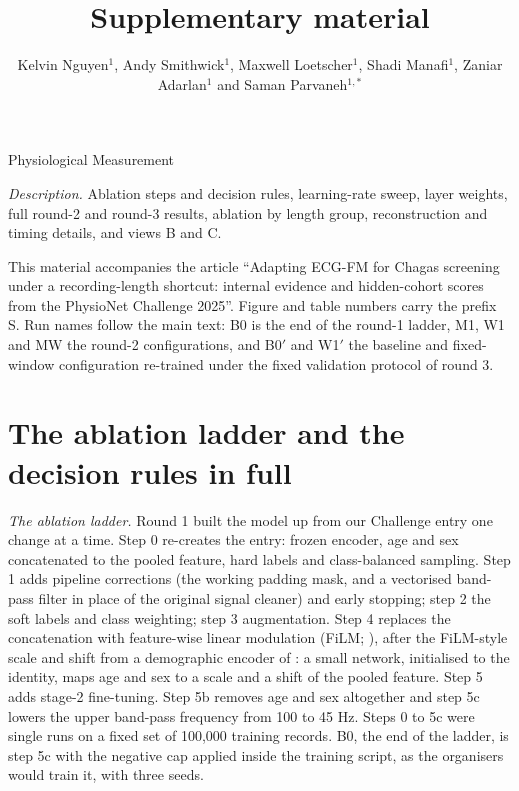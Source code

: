 \documentclass{iopjournal}
\newcommand{\Bp}{B0$'$}
\newcommand{\Wp}{W1$'$}
\renewcommand{\articletype}[1]{{\vspace*{-8mm}\noindent \Large \sf Physiological Measurement}

\vspace{4mm}\noindent{\scriptsize \sf{\bfseries \MakeUppercase{#1}}}}
\begin{document}
\articletype{Supplementary material}

\title{Supplementary material}

\author{Kelvin Nguyen$^1$, Andy Smithwick$^1$, Maxwell Loetscher$^1$, Shadi Manafi$^1$, Zaniar Adarlan$^1$ and Saman Parvaneh$^{1,*}$}




\vspace{6mm}
\noindent\textit{Description.} Ablation steps and decision rules, learning-rate sweep, layer weights, full round-2 and round-3 results, ablation by length group, reconstruction and timing details, and views B and C.

\vspace{3mm}
\noindent This material accompanies the article ``Adapting ECG-FM for Chagas screening under a recording-length shortcut: internal evidence and hidden-cohort scores from the PhysioNet Challenge 2025''. Figure and table numbers carry the prefix S. Run names follow the main text: B0 is the end of the round-1 ladder, M1, W1 and MW the round-2 configurations, and \Bp{} and \Wp{} the baseline and fixed-window configuration re-trained under the fixed validation protocol of round 3.

\section{The ablation ladder and the decision rules in full}\label{SN1}
\textit{The ablation ladder.} Round 1 built the model up from our Challenge entry one change at a time. Step 0 re-creates the entry: frozen encoder, age and sex concatenated to the pooled feature, hard labels and class-balanced sampling. Step 1 adds pipeline corrections (the working padding mask, and a vectorised band-pass filter in place of the original signal cleaner) and early stopping; step 2 the soft labels and class weighting; step 3 augmentation. Step 4 replaces the concatenation with feature-wise linear modulation (FiLM; \citealp{perez2018}), after the FiLM-style scale and shift from a demographic encoder of \citet{vansantvliet2025}: a small network, initialised to the identity, maps age and sex to a scale and a shift of the pooled feature. Step 5 adds stage-2 fine-tuning. Step 5b removes age and sex altogether and step 5c lowers the upper band-pass frequency from 100 to 45 Hz. Steps 0 to 5c were single runs on a fixed set of 100,000 training records. B0, the end of the ladder, is step 5c with the negative cap applied inside the training script, as the organisers would train it, with three seeds.
\end{document}
